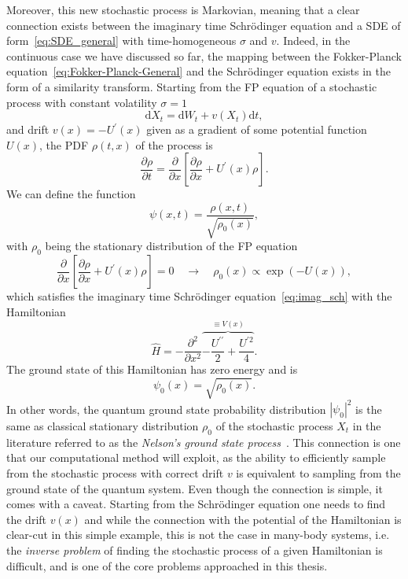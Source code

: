 Moreover, this new stochastic process is Markovian, meaning that a clear connection exists between the imaginary time Schr\" odinger equation and a SDE of form~\eqref{eq:SDE_general} with time-homogeneous $\sigma$ and $v$.
Indeed, in the continuous case we have discussed so far, the mapping between the Fokker-Planck equation~\eqref{eq:Fokker-Planck-General} and the Schr\" odinger equation exists in the form of a similarity transform. Starting from the FP equation of a stochastic process with constant volatility $\sigma = 1$
\begin{equation}
\label{eq:not_prime_cont_process}
\mathrm{d} X_{t}=\mathrm{d} W_{t}+v\left(X_{t}\right) \mathrm{d} t,
\end{equation} 
and drift $v(x)=-U^\prime(x)$ given as a gradient of some potential function $U(x)$, the PDF $\rho(t, x)$ of the process is
\begin{equation}
\frac{\partial \rho}{\partial t} = \frac{\partial}{\partial x}\left[\frac{\partial \rho}{\partial x}+U^{\prime}(x) \rho\right].
\end{equation}
We can define the function 
\begin{equation}
\psi(x, t)=\frac{\rho(x, t)}{\sqrt{\rho_{0}(x)}},
\end{equation}
with $\rho_{0}$ being the stationary distribution of the FP equation
\begin{equation}
\frac{\partial}{\partial x}\left[\frac{\partial \rho}{\partial x}+U^{\prime}(x) \rho\right] = 0 \quad \rightarrow \quad \rho_{0}(x) \propto \exp (-U(x)),
\end{equation}
which satisfies the imaginary time Schr\" odinger equation~\eqref{eq:imag_sch} with the Hamiltonian
\begin{equation}
\hat H=-\frac{\partial^{2}}{\partial x^{2}} \overbrace{-\frac{U^{\prime \prime}}{2}+\frac{U^{\prime 2}}{4}}^{\equiv V(x)}.
\end{equation}
The ground state of this Hamiltonian has zero energy and is 
\begin{equation}
\psi_{0}(x)=\sqrt{\rho_{0}(x)}.
\end{equation}
In other words, the quantum ground state probability distribution $|\psi_{0}|^2$ is the same as classical stationary distribution $\rho_{0}$ of the stochastic process $X_{t}$ in the literature referred to as the \emph{Nelson's ground state process}~\cite{nelson1967dynamical, albeverio1977energy}. This connection is one that our computational method will exploit, as the ability to efficiently sample from the stochastic process with correct drift $v$ is equivalent to sampling from the ground state of the quantum system. Even though the connection is simple, it comes with a caveat. Starting from the Schr\" odinger equation one needs to find the drift $v(x)$ and while the connection with the potential of the Hamiltonian is clear-cut in this simple example, this is not the case in many-body systems, i.e. the \emph{inverse problem} of finding the stochastic process of a given Hamiltonian is difficult, and is one of the core problems approached in this thesis.

